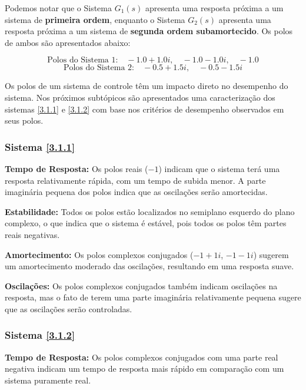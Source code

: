 \documentclass[a4paper,12pt]{article}
\begin{document}
Podemos notar que o Sistema $G_1(s)$ apresenta uma resposta próxima a um sistema de \textbf{primeira ordem}, enquanto o Sistema $G_2(s)$ apresenta uma resposta próxima a um sistema de \textbf{segunda ordem subamortecido}. Os polos de ambos são apresentados abaixo:

\begin{equation*}
\text{Polos do Sistema 1:} \quad -1.0 + 1.0i, \quad -1.0 - 1.0i, \quad -1.0
\end{equation*}
\begin{equation*}
\text{Polos do Sistema 2:} \quad -0.5 + 1.5i, \quad -0.5 - 1.5i
\end{equation*}

Os polos de um sistema de controle têm um impacto direto no desempenho do sistema. Nos próximos subtópicos são apresentados uma caracterização dos sistemas \ref{3.1.1} e \ref{3.1.2} com base nos critérios de desempenho observados em seus polos.

\subsubsection{Sistema \ref{3.1.1}}\label{4.4.1.1}

\textbf{Tempo de Resposta:} Os polos reais ($-1$) indicam que o sistema terá uma resposta relativamente rápida, com um tempo de subida menor. A parte imaginária pequena dos polos indica que as oscilações serão amortecidas.

\textbf{Estabilidade:} Todos os polos estão localizados no semiplano esquerdo do plano complexo, o que indica que o sistema é estável, pois todos os polos têm partes reais negativas.

\textbf{Amortecimento:} Os polos complexos conjugados ($-1 + 1i$, $-1 - 1i$) sugerem um amortecimento moderado das oscilações, resultando em uma resposta suave.

\textbf{Oscilações:} Os polos complexos conjugados também indicam oscilações na resposta, mas o fato de terem uma parte imaginária relativamente pequena sugere que as oscilações serão controladas.

\subsubsection{Sistema \ref{3.1.2}}\label{4.4.1.2}

\textbf{Tempo de Resposta:} Os polos complexos conjugados com uma parte real negativa indicam um tempo de resposta mais rápido em comparação com um sistema puramente real.
\end{document}
